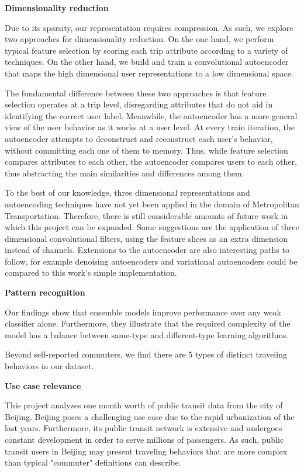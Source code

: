 \documentclass{article}
\begin{document}
\textbf{Dimensionality reduction}

Due to its sparsity, our representation requires compression. As such, we explore two approaches for dimensionality reduction. On the one hand, we perform typical feature selection by scoring each trip attribute according to a variety of techniques. On the other hand, we build and train a convolutional autoencoder that maps the high dimensional user representations to a low dimensional space. 

The fundamental difference between these two approaches is that feature selection operates at a trip level, disregarding attributes that do not aid in identifying the correct user label. Meanwhile, the autoencoder has a more general view of the user behavior as it works at a user level. At every train iteration, the autoencoder attempts to deconstruct and reconstruct each user's behavior, without committing each one of them to memory. Thus, while feature selection compares attributes to each other, the autoencoder compares users to each other, thus abstracting the main similarities and differences among them.

To the best of our knowledge, three dimensional representations and autoencoding techniques have not yet been applied in the domain of Metropolitan Transportation. Therefore, there is still considerable amounts of future work in which this project can be expanded. Some suggestions are the application of three dimensional convolutional filters, using the feature slices as an extra dimension instead of channels. Extensions to the autoencoder are also interesting paths to follow, for example denoising autoencoders and variational autoencoders could be compared to this work's simple implementation.

\textbf{Pattern recognition}

Our findings show that ensemble models improve performance over any weak classifier alone. Furthermore, they illustrate that the required complexity of the model has a balance between same-type and different-type learning algorithms. 

Beyond self-reported commuters, we find there are 5 types of distinct traveling behaviors in our dataset. 

\textbf{Use case relevance}

This project analyzes one month worth of public transit data from the city of Beijing. Beijing poses a challenging use case due to the rapid urbanization  of the last years. Furthermore, its public transit network is extensive and undergoes constant development in order to serve millions of passengers. As such, public transit users in Beijing may present traveling behaviors that are more complex than typical "commuter" definitions can describe. 
\end{document}

